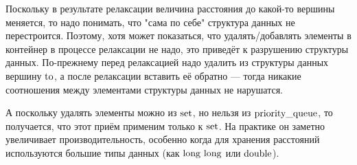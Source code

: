 Поскольку в результате релаксации величина расстояния до какой-то вершины меняется, то надо понимать, что "сама по себе" структура данных не перестроится. Поэтому, хотя может показаться, что удалять/добавлять элементы в контейнер в процессе релаксации не надо, это приведёт к разрушению структуры данных. По-прежнему перед релаксацией надо удалить из структуры данных вершину $\rm to$, а после релаксации вставить её обратно --- тогда никакие соотношения между элементами структуры данных не нарушатся.

А поскольку удалять элементы можно из $\rm set$, но нельзя из $\rm priority\_queue$, то получается, что этот приём применим только к $\rm set$. На практике он заметно увеличивает производительность, особенно когда для хранения расстояний используются большие типы данных (как $\rm long\ long$ или $\rm double$).